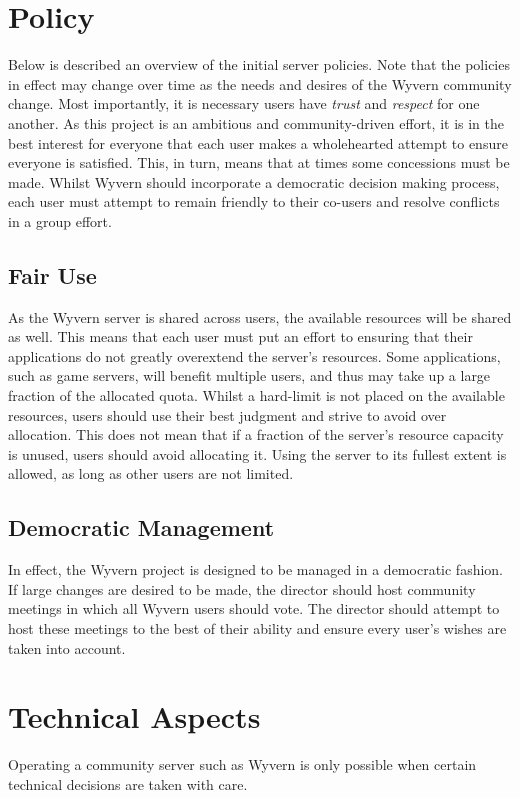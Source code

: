 
\section{Policy}
\label{sec:policy}
Below is described an overview of the initial server policies. Note that the policies in effect may change over time as the needs and desires of the Wyvern community change. Most importantly, it is necessary users have \textit{trust} and \textit{respect} for one another. As this project is an ambitious and community-driven effort, it is in the best interest for everyone that each user makes a wholehearted attempt to ensure everyone is satisfied. This, in turn, means that at times some concessions must be made. Whilst Wyvern should incorporate a democratic decision making process, each user must attempt to remain friendly to their co-users and resolve conflicts in a group effort.

\subsection{Fair Use}
As the Wyvern server is shared across users, the available resources will be shared as well. This means that each user must put an effort to ensuring that their applications do not greatly overextend the server's resources. Some applications, such as game servers, will benefit multiple users, and thus may take up a large fraction of the allocated quota. Whilst a hard-limit is not placed on the available resources, users should use their best judgment and strive to avoid over allocation. This does not mean that if a fraction of the server's resource capacity is unused, users should avoid allocating it. Using the server to its fullest extent is allowed, as long as other users are not limited.

\subsection{Democratic Management}
In effect, the Wyvern project is designed to be managed in a democratic fashion. If large changes are desired to be made, the director should host community meetings in which all Wyvern users should vote. The director should attempt to host these meetings to the best of their ability and ensure every user's wishes are taken into account.

\section{Technical Aspects}
\label{sec:technical}
Operating a community server such as Wyvern is only possible when certain technical decisions are taken with care.

